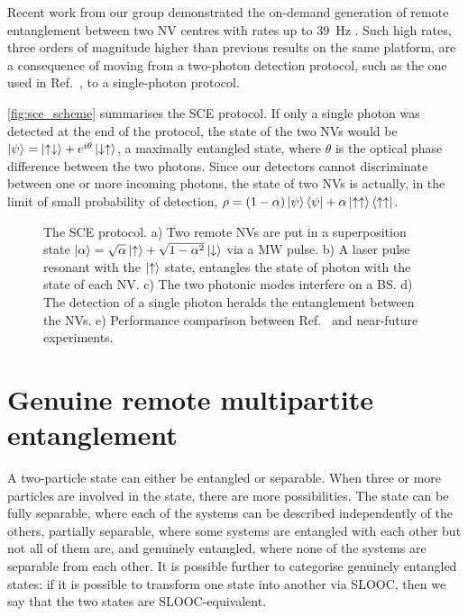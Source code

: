 \documentclass[a4paper, twoside]{article}
\begin{document}
Recent work from our group demonstrated the on-demand generation of remote entanglement between two \ac{NV} centres with rates up to \SI{39}{\Hz} \cite{Humphreys2018}. Such high rates, three orders of magnitude higher than previous results on the same platform, are a consequence of moving from a two-photon detection protocol, such as the one used in Ref.~\cite{Hensen2015}, to a single-photon protocol.

\autoref{fig:sce_scheme} summarises the \ac{SCE} protocol. If only a single photon was detected at the end of the protocol, the state of the two \acp{NV} would be $\ket\psi = \ket{\uparrow\downarrow} + e^{i\theta}\ket{\downarrow\uparrow}$, a maximally entangled state, where $\theta$ is the optical phase difference between the two photons. Since our detectors cannot discriminate between one or more incoming photons, the state of two \acp{NV} is actually, in the limit of small probability of detection, $\rho = (1-\alpha)\ket\psi\bra\psi + \alpha\ket{\uparrow\uparrow}\bra{\uparrow\uparrow}$.

\begin{figure}
	\caption{The \acf{SCE} protocol.
	a) Two remote \acp{NV} are put in a superposition state $\ket\alpha = \sqrt\alpha\ket\uparrow + \sqrt{1-\alpha^2}\ket\downarrow$ via a \ac{MW} pulse.
	b) A laser pulse resonant with the $\ket\uparrow$ state, entangles the state of photon with the state of each \ac{NV}.
	c) The two photonic modes interfere on a \ac{BS}.
	d) The detection of a single photon heralds the entanglement between the \acp{NV}.
	e) Performance comparison between Ref.~\cite{Humphreys2018} and near-future experiments.}
	\label{fig:sce_scheme}
\end{figure}

\section{Genuine remote multipartite entanglement}
A two-particle state can either be entangled or separable. When three or more particles are involved in the state, there are more possibilities. The state can be fully separable, where each of the systems can be described independently of the others, partially separable, where some systems are entangled with each other but not all of them are, and genuinely entangled, where none of the systems are separable from each other.
It is possible further to categorise genuinely entangled states: if it is possible to transform one state into another via \ac{SLOOC}, then we say that the two states are \ac{SLOOC}-equivalent.
\end{document}
